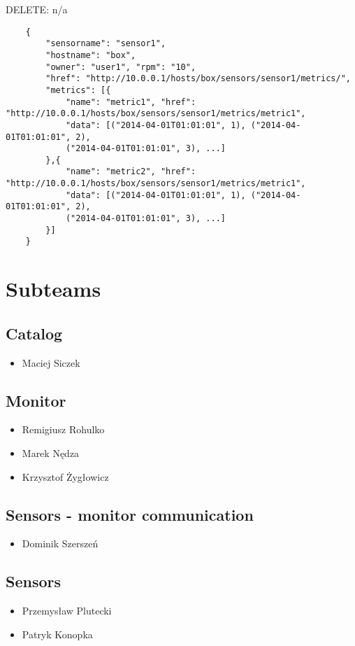 \documentclass[a4paper]{article}
\begin{document}
\begin{itemize}
\begin{description}
		\item{DELETE}: n/a
	\end{description}
	\begin{verbatim}
	{
		"sensorname": "sensor1",
		"hostname": "box",
		"owner": "user1", "rpm": "10",
		"href": "http://10.0.0.1/hosts/box/sensors/sensor1/metrics/",
		"metrics": [{
			"name": "metric1", "href": "http://10.0.0.1/hosts/box/sensors/sensor1/metrics/metric1",
			"data": [("2014-04-01T01:01:01", 1), ("2014-04-01T01:01:01", 2),
			("2014-04-01T01:01:01", 3), ...]
		},{
			"name": "metric2", "href": "http://10.0.0.1/hosts/box/sensors/sensor1/metrics/metric1",
			"data": [("2014-04-01T01:01:01", 1), ("2014-04-01T01:01:01", 2),
			("2014-04-01T01:01:01", 3), ...]
		}]
	}
	\end{verbatim}
\end{itemize}
\clearpage
\section{Subteams}
\subsection{Catalog}
\begin{itemize}
\item Maciej Siczek
\end{itemize}
\subsection{Monitor}
\begin{itemize}
\item Remigiusz Rohulko
\item Marek Nędza
\item Krzysztof Żygłowicz
\end{itemize}
\subsection{Sensors - monitor communication}
\begin{itemize}
\item Dominik Szerszeń
\end{itemize}
\subsection{Sensors}
\begin{itemize}
\item Przemysław Plutecki
\item Patryk Konopka
\end{itemize}
\end{document}
